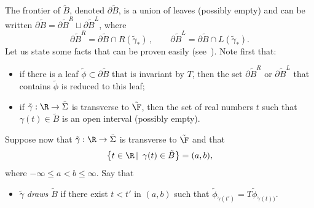 The frontier of $\tilde B$, denoted $\partial \tilde B$, is a union of leaves (possibly empty) and can be written $\partial\tilde B=\partial\tilde B^R\sqcup\partial\tilde B^L$, where
\[
\partial\tilde B^R=\partial\tilde B\cap R(\tilde\gamma_*)\,,\qquad \partial\tilde B^L=\partial\tilde B\cap L(\tilde\gamma_*).
\]
Let us state some facts that can be proven easily (see~\cite [Lemme~2.1.7]{Lel}). Note first that:
\begin{itemize}
\item if there is a leaf $\tilde \phi\subset \partial\tilde B$ that is invariant by $T$, then the set $ \partial\tilde B^R$ or $ \partial\tilde B^L$ that contains $\tilde\phi$ is reduced to this leaf;
\item if $\tilde\gamma:\R\to\tilde\Sigma$ is transverse to $\tilde{\F}$, then the set of real numbers $t$ such that $\gamma(t)\in\tilde B$ is an open interval (possibly empty).
\end{itemize}
Suppose now that $\tilde\gamma:\R\to\tilde\Sigma$ is transverse to $\tilde{\F}$ and that
\[
\big\{ t\in\R\,\vert\enskip \gamma(t)\in\tilde B\big\}=(a,b),
\]
where $-\infty\leq a<b\leq\infty$. Say that
\begin{itemize}
\item $\tilde\gamma$ \emph{draws $\tilde B$} if there exist $t<t'$ in $(a,b)$ such that $\tilde\phi_{\tilde\gamma(t')}=T\tilde\phi_{\tilde\gamma(t))}$.
\end{itemize}


